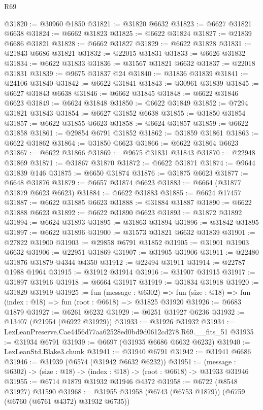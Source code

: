 \begin{lexlean}{R69}
\begin{coremodule}
{@31820 := @30960 @1850
@31821 := @31820 @6632
@31823 := @6627 @31821 @6638
@31824 := @6662 @31823
@31825 := @6622 @31824
@31827 := @21839 @6686 @31821
@31828 := @6662 @31827
@31829 := @6622 @31828
@31831 := @21843 @6686 @31821
@31832 := @22015 @31831
@31833 := @6626 @31832
@31834 := @6622 @31833
@31836 := @31567 @31821 @6632
@31837 := @22018 @31831
@31839 := @9675 @31837 @24
@31840 := @31836 @31839
@31841 := @24106 @31840
@31842 := @6622 @31841
@31843 := @30961 @31839
@31845 := @6627 @31843 @6638
@31846 := @6662 @31845
@31848 := @6622 @31846 @6623
@31849 := @6624 @31848
@31850 := @6622 @31849
@31852 := @7294 @31821 @31843
@31854 := @6627 @31852 @6638
@31855 := @31850 @31854
@31857 := @6622 @31855 @6623
@31858 := @6624 @31857
@31859 := @6622 @31858
@31861 := @29854 @6791 @31852
@31862 := @31859 @31861
@31863 := @6622 @31862
@31864 := @31850 @6623
@31866 := @6622 @31864 @6623
@31867 := @6622 @31866
@31869 := @9675 @31831 @31843
@31870 := @22948 @31869
@31871 := @31867 @31870
@31872 := @6622 @31871
@31874 := @9644 @31839 @146
@31875 := @6650 @31874
@31876 := @31875 @6623
@31877 := @6648 @31876
@31879 := @6657 @31874 @6623
@31883 := @6664 (@31877 @31879 @6623 @6623)
@31884 := @6622 @31883
@31885 := @6624 @17457
@31887 := @6622 @31885 @6623
@31888 := @31884 @31887
@31890 := @6622 @31888 @6623
@31892 := @6622 @31890 @6623
@31893 := @31872 @31892
@31894 := @6624 @31893
@31895 := @31863 @31894
@31896 := @31842 @31895
@31897 := @6622 @31896
@31900 := @31573 @31821 @6632 @31839
@31901 := @27822 @31900
@31903 := @29858 @6791 @31852
@31905 := @31901 @31903 @6632
@31906 := @22951 @31869
@31907 := @31905 @31906
@31911 := @22480 @31876 @31879 @4344 @4350
@31912 := @22494 @31911
@31914 := @22787 @1988 @1964
@31915 := @31912 @31914
@31916 := @31907 @31915
@31917 := @31897 @31916
@31918 := @6664 @31917
@31919 := @31834 @31918
@31920 := @31829 @31919
@31925 := fun (message : @6302) =>
  fun (size : @18) => fun (index : @18) => fun (root : @6618) => @31825 @31920
@31926 := @6683 @1879
@31927 := @6261 @6232
@31929 := @6251 @31927 @6236
@31932 := @13407 (@21954 (@6922 @31929))
@31933 := @31926 @31932
@31934 := LexLeanPreserve.Cae4456d77aa62528ed0bd9d0612cd278.R69.__fits_51
@31935 := @31934 @6791
@31939 := @6697 (@31935 @6686 @6632 @6232)
@31940 := LexLeanStd.Blake3.chunk
@31941 := @31940 @6791
@31942 := @31941 @6686
@31946 := @31939 (@6574 (@31942 @6632 @6232))
@31951 := (message : @6302) -> (size : @18) -> (index : @18) -> (root : @6618) -> @31933 @31946
@31955 := @6714 @1879 @31932 @31946 @4372
@31958 := @6722 (@8548 @31927) @31590
@31968 := @31955 @31958 (@6743 (@6753 @1879)) (@6759 (@6760 (@6761 @4372) @31932 @6735))
}
\end{coremodule}
\end{lexlean}
